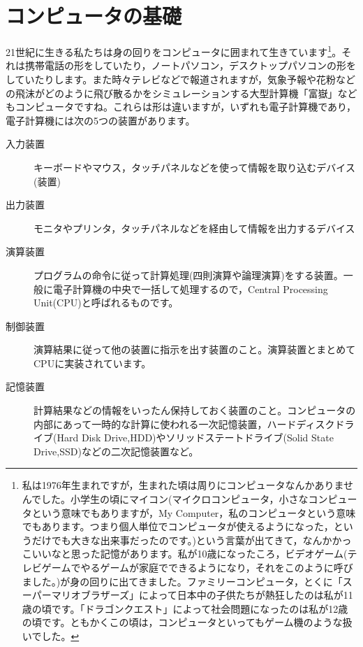 \documentclass{ltjsbook}
\begin{document}
\section{コンピュータの基礎}
21世紀に生きる私たちは身の回りをコンピュータに囲まれて生きています\footnote{私は1976年生まれですが，生まれた頃は周りにコンピュータなんかありませんでした。小学生の頃にマイコン(マイクロコンピュータ，小さなコンピュータという意味でもありますが，My Computer，私のコンピュータという意味でもあります。つまり個人単位でコンピュータが使えるようになった，というだけでも大きな出来事だったのです。)という言葉が出てきて，なんかかっこいいなと思った記憶があります。私が10歳になったころ，ビデオゲーム(テレビゲームでやるゲームが家庭でできるようになり，それをこのように呼びました。)が身の回りに出てきました。ファミリーコンピュータ，とくに「スーパーマリオブラザーズ」によって日本中の子供たちが熱狂したのは私が11歳の頃です。「ドラゴンクエスト」によって社会問題になったのは私が12歳の頃です。ともかくこの頃は，コンピュータといってもゲーム機のような扱いでした。}。それは携帯電話の形をしていたり，ノートパソコン，デスクトップパソコンの形をしていたりします。また時々テレビなどで報道されますが，気象予報や花粉などの飛沫がどのように飛び散るかをシミュレーションする大型計算機「富嶽」などもコンピュータですね。これらは形は違いますが，いずれも電子計算機であり，電子計算機には次の5つの装置があります。
\begin{description}
	\item[入力装置] キーボードやマウス，タッチパネルなどを使って情報を取り込むデバイス(装置)
	\item[出力装置] モニタやプリンタ，タッチパネルなどを経由して情報を出力するデバイス
	\item[演算装置] プログラムの命令に従って計算処理(四則演算や論理演算)をする装置。一般に電子計算機の中央で一括して処理するので，Central Processing Unit(CPU)と呼ばれるものです。
	\item[制御装置] 演算結果に従って他の装置に指示を出す装置のこと。演算装置とまとめてCPUに実装されています。
	\item[記憶装置] 計算結果などの情報をいったん保持しておく装置のこと。コンピュータの内部にあって一時的な計算に使われる一次記憶装置，ハードディスクドライブ(Hard Disk Drive,HDD)やソリッドステートドライブ(Solid State Drive,SSD)などの二次記憶装置など。
\end{description}
\end{document}
